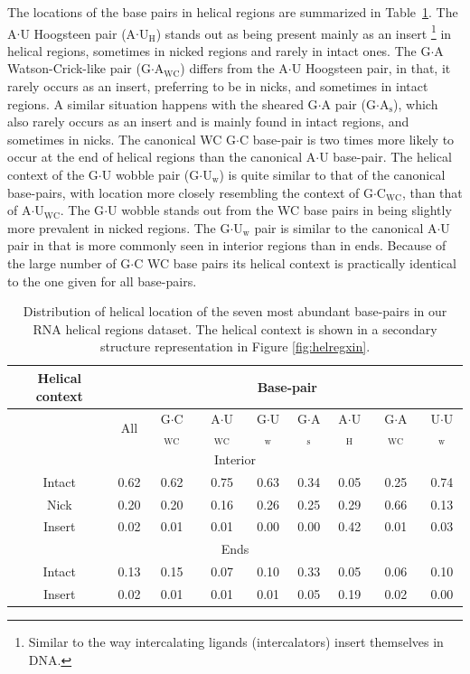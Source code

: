The locations of  the base pairs in helical  regions are summarized in
Table~\ref{tab:helcontext}.     The     A$\cdot$U    Hoogsteen    pair
(A$\cdot$U$_{\text{H}}$)  stands out  as  being present  mainly as  an
insert   \footnote{Similar   to    the   way   intercalating   ligands
  (intercalators)  insert  themselves  in  DNA.} in  helical  regions,
sometimes in nicked  regions and rarely in intact  ones. The G$\cdot$A
Watson-Crick-like  pair  (G$\cdot$A$_{\text{WC}}$)  differs  from  the
A$\cdot$U  Hoogsteen pair,  in that,  it rarely  occurs as  an insert,
preferring to be in nicks,  and sometimes in intact regions. A similar
situation     happens    with     the    sheared     G$\cdot$A    pair
(G$\cdot$A$_{\text{s}}$), which also rarely occurs as an insert and is
mainly found in intact regions, and sometimes in nicks.  The canonical
WC G$\cdot$C base-pair is two times more likely to occur at the end of
helical regions than the canonical A$\cdot$U base-pair.  The
helical context of  the G$\cdot$U wobble pair (G$\cdot$U$_{\text{w}}$)
is quite similar to that of the canonical base-pairs, with location more closely
resembling  the  context  of  G$\cdot$C$_{\text{WC}}$,  than  that  of
A$\cdot$U$_{\text{WC}}$.  The G$\cdot$U wobble  stands out from the WC
base pairs  in being  slightly more prevalent  in nicked  regions. The
G$\cdot$U$_{\text{w}}$ pair is similar to the canonical A$\cdot$U pair
in that is more commonly seen in
interior  regions  than  in  ends.  Because of  the  large  number  of
G$\cdot$C WC  base pairs its helical context  is practically identical
to the one given for all base-pairs.

\begin{table}[htbp]
\begin{center}
\begin{tabular}{|c|c|c|c|c|c|c|c|c|}
\hline
Helical context & \multicolumn{8}{c|}{Base-pair} \\
\hline
 & All & G$\cdot$C$_{\text{WC}}$ & A$\cdot$U$_{\text{WC}}$ &
G$\cdot$U$_{\text{w}}$ & G$\cdot$A$_{\text{s}}$ &
A$\cdot$U$_{\text{H}}$ & G$\cdot$A$_{\text{WC}}$ &
U$\cdot$U$_{\text{w}}$  \\
\hline
\multicolumn{9}{|c|}{Interior} \\
\hline
Intact &  0.62 & 0.62 & 0.75 & 0.63 & 0.34 & 0.05 & 0.25 & 0.74 \\
Nick   &  0.20 & 0.20 & 0.16 & 0.26 & 0.25 & 0.29 & 0.66 & 0.13 \\
Insert &  0.02 & 0.01 & 0.01 & 0.00 & 0.00 & 0.42 & 0.01 & 0.03 \\
\hline
\multicolumn{9}{|c|}{Ends} \\
\hline
Intact &  0.13 & 0.15 & 0.07 & 0.10 & 0.33 & 0.05 & 0.06 & 0.10 \\
Insert &  0.02 & 0.01 & 0.01 & 0.01 & 0.05 & 0.19 & 0.02 & 0.00 \\
\hline
\end{tabular}
\caption{Distribution of helical location of the seven most abundant
  base-pairs in  our RNA helical regions dataset.  The helical context
  is  shown in  a secondary  structure representation  in Figure
  \ref{fig:helregxin}.}
\label{tab:helcontext}
\end{center}
\end{table}

